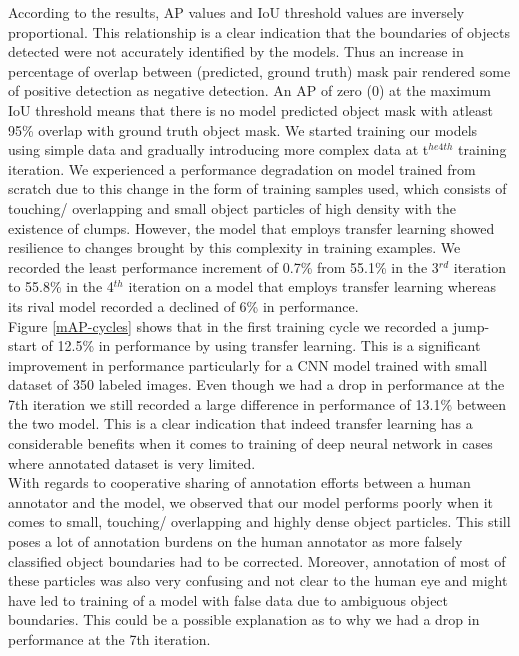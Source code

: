 \documentclass[conference]{IEEEtran}
\begin{document}
	According to the results, AP values and IoU threshold values are inversely proportional. This relationship is a clear indication that the boundaries of objects detected were not accurately identified by the models. Thus an increase in percentage of overlap between (predicted, ground truth) mask pair rendered some of positive detection as negative detection. An AP of zero (0) at the maximum IoU threshold means that there is no model predicted object mask with atleast 95\% overlap with ground truth object mask. We started training our models using simple data and gradually introducing more complex data at t$ ^{he 4th} $ training iteration. We experienced a performance degradation on model
trained from scratch due to this change in the form of training samples used, which consists of touching/ overlapping and small object particles of high density with the existence of clumps. However, the model that employs transfer learning showed resilience to changes brought by this complexity in training examples. We recorded the least performance increment of 0.7\% from 55.1\% in the 3$ ^{rd} $ iteration to 55.8\% in the 4$ ^{th} $ iteration on a model that
employs transfer learning whereas its rival model recorded a declined of 6\% in performance.\\
	
	Figure \ref{mAP-cycles} shows that in the first training cycle we recorded a jump-start of 12.5\% in performance by using transfer learning. This is a significant improvement in performance particularly for a CNN model trained with small dataset of 350 labeled images. Even though we had a drop in performance at the 7th iteration we still recorded a large difference in
performance of 13.1\% between the two model. This is a clear indication that indeed transfer
learning has a considerable benefits when it comes to training of deep neural network in
cases where annotated dataset is very limited.\\
		
	With regards to cooperative sharing of annotation efforts between a human annotator and the model, we observed that our model performs poorly when it comes to small, touching/ overlapping and highly dense object particles. This still poses a lot of annotation
burdens on the human annotator as more falsely classified object boundaries had to be
corrected. Moreover, annotation of most of these particles was also very confusing and not
clear to the human eye and might have led to training of a model with false data due to
ambiguous object boundaries. This could be a possible explanation as to why we had a
drop in performance at the 7th iteration.
		
\end{document}
